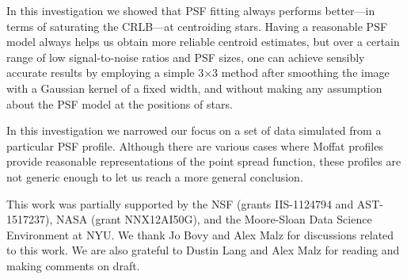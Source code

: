 In this investigation we showed that PSF fitting always performs better---in terms of saturating the CRLB---at centroiding stars. Having a reasonable PSF model always helps us obtain more reliable centroid estimates, but over a certain range of low signal-to-noise ratios and PSF sizes, one can achieve sensibly accurate results by employing a simple 3$\times$3 method after smoothing the image with a Gaussian kernel of a fixed width, and without making any assumption about the PSF model 
at the positions of stars.

In this investigation we narrowed our focus on a set of data simulated from a particular PSF profile. Although there are various cases where Moffat profiles provide reasonable representations of the point spread function, these profiles are not generic enough to let us reach a more general conclusion.

This work was partially supported by the NSF (grants IIS-1124794 and AST-1517237), NASA (grant NNX12AI50G), and the Moore-Sloan Data Science Environment at NYU. We thank Jo Bovy and Alex Malz for discussions related to this work. We are also grateful to Dustin Lang and Alex Malz for reading and making comments on draft.


\clearpage

